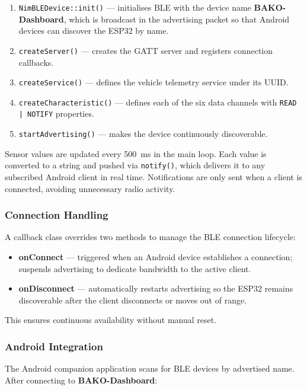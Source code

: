 \begin{enumerate}
    \item \texttt{NimBLEDevice::init()} --- initialises BLE with the device name \textbf{BAKO-Dashboard}, which is broadcast in the advertising packet so that Android devices can discover the ESP32 by name.
    \item \texttt{createServer()} --- creates the GATT server and registers connection callbacks.
    \item \texttt{createService()} --- defines the vehicle telemetry service under its UUID.
    \item \texttt{createCharacteristic()} --- defines each of the six data channels with \texttt{READ | NOTIFY} properties.
    \item \texttt{startAdvertising()} --- makes the device continuously discoverable.
\end{enumerate}

Sensor values are updated every 500~ms in the main loop. Each value is converted to a string and pushed via \texttt{notify()}, which delivers it to any subscribed Android client in real time. Notifications are only sent when a client is connected, avoiding unnecessary radio activity.

\subsubsection*{Connection Handling}

A callback class overrides two methods to manage the BLE connection lifecycle:

\begin{itemize}
    \item \textbf{onConnect} --- triggered when an Android device establishes a connection; suspends advertising to dedicate bandwidth to the active client.
    \item \textbf{onDisconnect} --- automatically restarts advertising so the ESP32 remains discoverable after the client disconnects or moves out of range.
\end{itemize}

This ensures continuous availability without manual reset.

\subsubsection*{Android Integration}

The Android companion application scans for BLE devices by advertised name. After connecting to \textbf{BAKO-Dashboard}:

